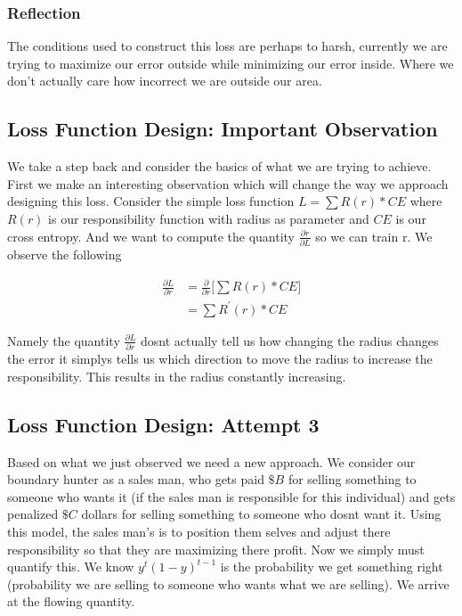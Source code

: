 \documentclass{article}
\begin{document}
\subsubsection{Reflection}
The conditions used to construct this loss are perhaps to harsh, currently we are trying to maximize our error outside while minimizing our error inside. Where we don't actually care how incorrect we are outside our area.

\subsection{Loss Function Design: Important Observation}
We take a step back and consider the basics of what we are trying to achieve. First we make an interesting observation which will change the way we approach designing this loss. Consider the simple loss function $L =\sum R(r) * CE$ where $R(r)$ is our responsibility function with radius as parameter and $CE$ is our cross entropy. And we want to compute the quantity $\frac{\partial r}{\partial L}$ so we can train r. We observe the following

\begin{align*}
\frac{\partial L}{\partial r} &= \frac{\partial}{\partial r} \big[ \sum R(r) * CE \big] \\
&= \sum R^{'} (r) * CE
\end{align*} 

Namely the quantity $\frac{\partial L}{\partial r}$ dosnt actually tell us how changing the radius changes the error it simplys tells us which direction to move the radius to increase the responsibility. This results in the radius constantly increasing.\\

\subsection{Loss Function Design: Attempt 3}
Based on what we just observed we need a new approach. We consider our boundary hunter as a sales man, who gets paid $\$B$ for selling something to someone who wants it (if the sales man is responsible for this individual) and gets penalized $\$C$ dollars for selling something to someone who dosnt want it. Using this model, the sales man's is to position them selves and adjust there responsibility so that they are maximizing there profit. Now we simply must quantify this. We know $y^t(1-y)^{t-1}$ is the probability we get something right (probability we are selling to someone who wants what we are selling). We arrive at the flowing quantity.
\end{document}
